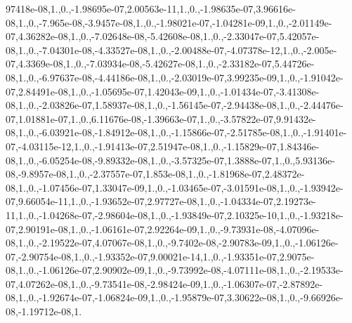 \begin{DoxyCompactItemize}
\-97418e-\/08,1.,0.,-\/1.\-98695e-\/07,2.\-00563e-\/11,1.,0.,-\/1.\-98635e-\/07,3.\-96616e-\/08,1.,0.,-\/7.\-965e-\/08,-\/3.\-9457e-\/08,1.,0.,-\/1.\-98021e-\/07,-\/1.\-04281e-\/09,1.,0.,-\/2.\-01149e-\/07,4.\-36282e-\/08,1.,0.,-\/7.\-02648e-\/08,-\/5.\-42608e-\/08,1.,0.,-\/2.\-33047e-\/07,5.\-42057e-\/08,1.,0.,-\/7.\-04301e-\/08,-\/4.\-33527e-\/08,1.,0.,-\/2.\-00488e-\/07,-\/4.\-07378e-\/12,1.,0.,-\/2.\-005e-\/07,4.\-3369e-\/08,1.,0.,-\/7.\-03934e-\/08,-\/5.\-42627e-\/08,1.,0.,-\/2.\-33182e-\/07,5.\-44726e-\/08,1.,0.,-\/6.\-97637e-\/08,-\/4.\-44186e-\/08,1.,0.,-\/2.\-03019e-\/07,3.\-99235e-\/09,1.,0.,-\/1.\-91042e-\/07,2.\-84491e-\/08,1.,0.,-\/1.\-05695e-\/07,1.\-42043e-\/09,1.,0.,-\/1.\-01434e-\/07,-\/3.\-41308e-\/08,1.,0.,-\/2.\-03826e-\/07,1.\-58937e-\/08,1.,0.,-\/1.\-56145e-\/07,-\/2.\-94438e-\/08,1.,0.,-\/2.\-44476e-\/07,1.\-01881e-\/07,1.,0.,6.\-11676e-\/08,-\/1.\-39663e-\/07,1.,0.,-\/3.\-57822e-\/07,9.\-91432e-\/08,1.,0.,-\/6.\-03921e-\/08,-\/1.\-84912e-\/08,1.,0.,-\/1.\-15866e-\/07,-\/2.\-51785e-\/08,1.,0.,-\/1.\-91401e-\/07,-\/4.\-03115e-\/12,1.,0.,-\/1.\-91413e-\/07,2.\-51947e-\/08,1.,0.,-\/1.\-15829e-\/07,1.\-84346e-\/08,1.,0.,-\/6.\-05254e-\/08,-\/9.\-89332e-\/08,1.,0.,-\/3.\-57325e-\/07,1.\-3888e-\/07,1.,0.,5.\-93136e-\/08,-\/9.\-8957e-\/08,1.,0.,-\/2.\-37557e-\/07,1.\-853e-\/08,1.,0.,-\/1.\-81968e-\/07,2.\-48372e-\/08,1.,0.,-\/1.\-07456e-\/07,1.\-33047e-\/09,1.,0.,-\/1.\-03465e-\/07,-\/3.\-01591e-\/08,1.,0.,-\/1.\-93942e-\/07,9.\-66054e-\/11,1.,0.,-\/1.\-93652e-\/07,2.\-97727e-\/08,1.,0.,-\/1.\-04334e-\/07,2.\-19273e-\/11,1.,0.,-\/1.\-04268e-\/07,-\/2.\-98604e-\/08,1.,0.,-\/1.\-93849e-\/07,2.\-10325e-\/10,1.,0.,-\/1.\-93218e-\/07,2.\-90191e-\/08,1.,0.,-\/1.\-06161e-\/07,2.\-92264e-\/09,1.,0.,-\/9.\-73931e-\/08,-\/4.\-07096e-\/08,1.,0.,-\/2.\-19522e-\/07,4.\-07067e-\/08,1.,0.,-\/9.\-7402e-\/08,-\/2.\-90783e-\/09,1.,0.,-\/1.\-06126e-\/07,-\/2.\-90754e-\/08,1.,0.,-\/1.\-93352e-\/07,9.\-00021e-\/14,1.,0.,-\/1.\-93351e-\/07,2.\-9075e-\/08,1.,0.,-\/1.\-06126e-\/07,2.\-90902e-\/09,1.,0.,-\/9.\-73992e-\/08,-\/4.\-07111e-\/08,1.,0.,-\/2.\-19533e-\/07,4.\-07262e-\/08,1.,0.,-\/9.\-73541e-\/08,-\/2.\-98424e-\/09,1.,0.,-\/1.\-06307e-\/07,-\/2.\-87892e-\/08,1.,0.,-\/1.\-92674e-\/07,-\/1.\-06824e-\/09,1.,0.,-\/1.\-95879e-\/07,3.\-30622e-\/08,1.,0.,-\/9.\-66926e-\/08,-\/1.\-19712e-\/08,1.
\end{DoxyCompactItemize}
